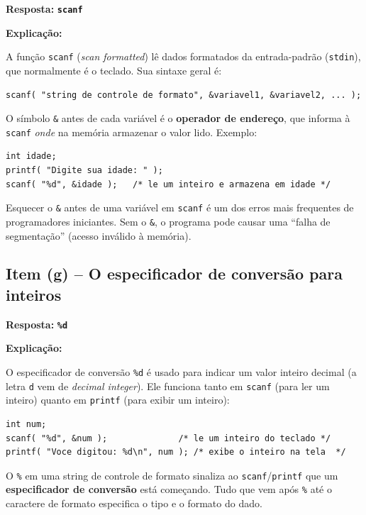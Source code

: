 \documentclass[12pt,a4paper]{article}
\begin{document}
\begin{respostabox}
\textbf{Resposta:} \textcolor{deitelblue}{\textbf{\texttt{scanf}}}

\medskip\textbf{Explicação:}

A função \texttt{scanf} (\textit{scan formatted}) lê dados formatados da entrada-padrão
(\texttt{stdin}), que normalmente é o teclado. Sua sintaxe geral é:

\begin{lstlisting}
scanf( "string de controle de formato", &variavel1, &variavel2, ... );
\end{lstlisting}

O símbolo \texttt{\&} antes de cada variável é o \textbf{operador de endereço}, que
informa à \texttt{scanf} \textit{onde} na memória armazenar o valor lido. Exemplo:

\begin{lstlisting}
int idade;
printf( "Digite sua idade: " );
scanf( "%d", &idade );   /* le um inteiro e armazena em idade */
\end{lstlisting}

\begin{erroco}
  Esquecer o \texttt{\&} antes de uma variável em \texttt{scanf} é um dos erros
  mais frequentes de programadores iniciantes. Sem o \texttt{\&}, o programa
  pode causar uma ``falha de segmentação'' (acesso inválido à memória).
\end{erroco}
\end{respostabox}

\subsection*{Item (g) -- O especificador de conversão para inteiros}

\begin{respostabox}
\textbf{Resposta:} \textcolor{deitelblue}{\textbf{\texttt{\%d}}}

\medskip\textbf{Explicação:}

O especificador de conversão \texttt{\%d} é usado para indicar um valor inteiro decimal
(a letra \texttt{d} vem de \textit{decimal integer}). Ele funciona tanto em
\texttt{scanf} (para ler um inteiro) quanto em \texttt{printf} (para exibir um inteiro):

\begin{lstlisting}
int num;
scanf( "%d", &num );              /* le um inteiro do teclado */
printf( "Voce digitou: %d\n", num ); /* exibe o inteiro na tela  */
\end{lstlisting}

O \texttt{\%} em uma string de controle de formato sinaliza ao \texttt{scanf}/\texttt{printf}
que um \textbf{especificador de conversão} está começando. Tudo que vem após \texttt{\%} até
o caractere de formato especifica o tipo e o formato do dado.
\end{respostabox}
\end{document}

